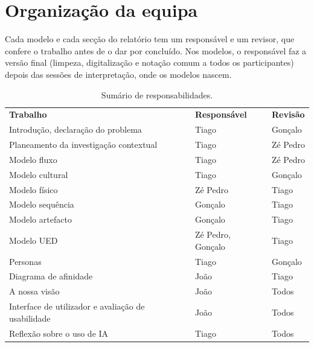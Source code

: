 \section{Organização da equipa}\label{anx:organizacao}
Cada modelo e cada secção do relatório tem um responsável e um revisor, que confere o trabalho antes de o dar por concluído. Nos modelos, o responsável faz a versão final (limpeza, digitalização e notação comum a todos os participantes) depois das sessões de interpretação, onde os modelos nascem.

\begin{table}[!htbp]
\centering\small
\begin{tabularx}{\textwidth}{@{}p{7cm}LL@{}}
\toprule
\textbf{Trabalho} & \textbf{Responsável} & \textbf{Revisão} \\
Introdução, declaração do problema & Tiago & Gonçalo \\
Planeamento da investigação contextual & Tiago & Zé Pedro \\
Modelo fluxo & Tiago & Zé Pedro \\
Modelo cultural& Tiago & Gonçalo \\
Modelo físico & Zé Pedro & Tiago \\
Modelo sequência & Gonçalo & Tiago \\
Modelo artefacto & Gonçalo & Tiago \\
Modelo UED & Zé Pedro, Gonçalo & Tiago \\
Personas & Tiago & Gonçalo \\
Diagrama de afinidade & João & Tiago \\
A nossa visão & João & Todos \\
Interface de utilizador e avaliação de usabilidade & João & Todos \\
Reflexão sobre o uso de IA & Tiago & Todos \\
\bottomrule
\end{tabularx}
\caption{Sumário de responsabilidades.}
\label{tab:donos}
\end{table}

